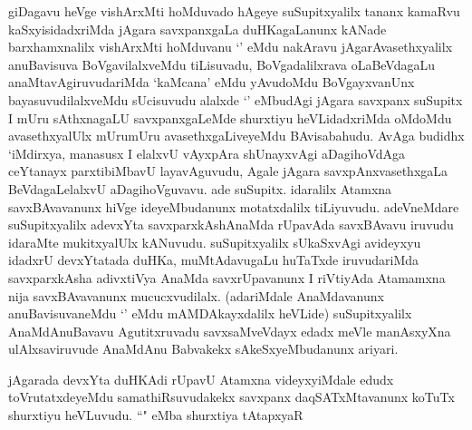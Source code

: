 \begin{artha}
giDagavu heVge vishArxMti hoMduvado hAgeye suSupitxyalilx tananx kamaRvu kaSxyisidadxriMda jAgara savxpanxgaLa duHKagaLanunx kANade barxhamxnalilx vishArxMti hoMduvanu `\stext ' eMdu nakAravu jAgarAvasethxyalilx anuBavisuva BoVgavilalxveMdu tiLisuvadu, BoVgadalilxrava oLaBeVdagaLu anaMtavAgiruvudariMda `kaMcana' eMdu yAvudoMdu BoVgayxvanUnx bayasuvudilalxveMdu sUcisuvudu alalxde `\stext ' eMbudAgi jAgara savxpanx suSupitx I mUru sAthxnagaLU savxpanxgaLeMde shurxtiyu heVLidadxriMda oMdoMdu avasethxyalUlx mUrumUru avasethxgaLiveyeMdu BAvisabahudu. AvAga budidhx `iMdirxya, manasusx I elalxvU vAyxpAra shUnayxvAgi aDagihoVdAga ceYtanayx parxtibiMbavU layavAguvudu, Agale jAgara savxpAnxvasethxgaLa BeVdagaLelalxvU aDagihoVguvavu. ade suSupitx. idaralilx Atamxna savxBAvavanunx hiVge ideyeMbudanunx motatxdalilx tiLiyuvudu. adeVneMdare suSupitxyalilx adevxYta savxparxkAshAnaMda rUpavAda savxBAvavu iruvudu idaraMte mukitxyalUlx kANuvudu. suSupitxyalilx sUkaSxvAgi avideyxyu idadxrU devxYtatada duHKa, muMtAdavugaLu huTaTxde iruvudariMda savxparxkAsha adivxtiVya AnaMda savxrUpavanunx I riVtiyAda Atamamxna nija savxBAvavanunx mucucxvudilalx. (adariMdale AnaMdavanunx anuBavisuvaneMdu `\stext ' eMdu mAMDAkayxdalilx heVLide) suSupitxyalilx AnaMdAnuBavavu Agutitxruvadu savxsaMveVdayx edadx meVle manAsxyXna ulAlxsaviruvude AnaMdAnu Babvakekx sAkeSxyeMbudanunx ariyari. 
\end{artha}


\begin{artha}
jAgarada devxYta duHKAdi rUpavU Atamxna videyxyiMdale edudx toVrutatxdeyeMdu samathiRsuvudakekx savxpanx daqSATxMtavanunx koTuTx shurxtiyu heVLuvudu. ``\stext " eMba shurxtiya tAtapxyaR
\end{artha}

